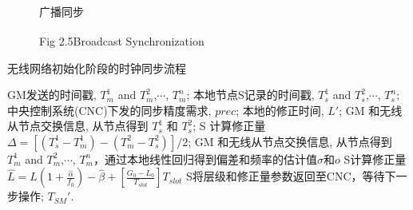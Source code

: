 \documentclass[UTF8,a4paper,12pt]{ctexart}
\numberwithin{equation}{section}
\begin{document}
	\begin{figure}[H]
		\caption{广播同步\textsuperscript{\cite{sangjumpa2016analysis}}}
		\vspace{-10pt}
		\caption*{Fig 2.5\quad Broadcast Synchronization\textsuperscript{\cite{sangjumpa2016analysis}}}
	\end{figure}
	\begin{algorithm}[ht]  
		\caption{无线网络初始化阶段的时钟同步流程}  
		\begin{algorithmic}[1]
			\REQUIRE GM发送的时间戳, $T_m^1$ and $T_m^2$,$\cdots$, $T_m^n$; 本地节点S记录的时间戳, $T_s^1$ and $T_s^2$,$\cdots$, $T_s^n$; 中央控制系统(CNC)下发的同步精度需求, $prec$;
			\ENSURE 本地的修正时间, $L'$;
			\STATE GM 和无线从节点交换信息, 从节点得到 $T_s^1$ 和 $T_s^2$; 
			\STATE S 计算修正量 $\Delta = [(T_s^1 - T_m^1) - (T_m^2 - T_s^2)]/2$;
			\ELSE  
			\STATE GM 和无线从节点交换信息, 从节点得到 $T_m^1$ and $T_m^2$,$\cdots$, $T_m^n$，通过本地线性回归得到偏差和频率的估计值$\sigma$和$o$	
			\STATE S计算修正量$\widehat{L}=L(1+\frac{\widehat{\alpha}}{f_0})-\widehat{\beta}+[\frac{G_0-L_0}{T_{slot}}]T_{slot}$			
			\ENDIF
			\STATE S将层级和修正量参数返回至CNC，等待下一步操作;
			\ENDWHILE
			\ENDWHILE
			\RETURN $T_{SM}'$.
		\end{algorithmic}
	\end{algorithm}
	
\end{document}
